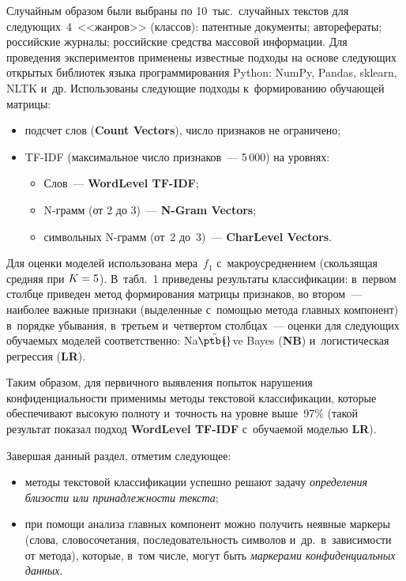 \begin{multicols}{2}
  Случайным образом были выбраны по 10~тыс.\ случайных текстов для  
сле\-ду\-ющих~4~<<жанров>> (классов): патентные документы; авторефераты; 
российские журналы; российские средства массовой информации. Для проведения экспериментов 
применены известные подходы на основе сле\-ду\-ющих открытых библиотек 
языка программирования Python: NumPy, Pandas, sklearn, NLTK и~др. 
Использованы следующие подходы к~формированию обучающей матрицы:
  \begin{itemize}
\item подсчет слов (\textbf{Count Vectors}), число признаков не 
ограничено;
\item TF-IDF (максимальное число признаков~--- 5\,000) на уровнях: 
\begin{itemize}
\item Слов~--- \textbf{WordLevel TF-IDF};
\item N-грамм (от 2 до 3)~--- \textbf{N-Gram Vectors};
\item символьных N-грамм (от~2 до~3)~--- \textbf{CharLevel 
Vectors}.
  \end{itemize}
  \end{itemize}
  
  Для оценки моделей использована мера~$f_1$ с~мак\-ро\-усред\-не\-ни\-ем 
(скользящая средняя при $K\hm=5$). В~табл.~1 приведены результаты 
классификации: в~первом столбце приведен метод формирования матрицы 
признаков, во втором~--- наиболее важные признаки (выделенные с~помощью 
метода главных компонент) в~порядке убывания, в~третьем и~четвертом 
столбцах~--- оценки для следующих обучаемых моделей соответственно: 
\mbox{Na$\ddot{\mbox{\ptb{\!\!\i}}}$ve} Bayes (\textbf{NB}) и~логистическая регрессия (\textbf{LR}).
  

  
  Таким образом, для первичного выявления попыток нарушения 
конфиденциальности применимы методы текстовой классификации, которые 
обеспечивают высокую полноту и~точность на \mbox{уровне} выше~97\% (такой 
результат показал подход \textbf{WordLevel TF-IDF} с~обуча\-емой моделью 
\textbf{LR}).
  
  Завершая данный раздел, отметим следующее:
  \begin{itemize}
\item методы текстовой классификации успешно решают задачу 
\textit{определения бли\-зости или принадлежности текста};
\item при помощи анализа главных компонент можно получить неявные 
маркеры (слова, словосочетания, последовательность символов и~др.\ 
в~зависимости от метода), которые, в~том чис\-ле, могут быть 
\textit{маркерами конфиденциальных данных}.
\end{itemize}


\end{multicols}
